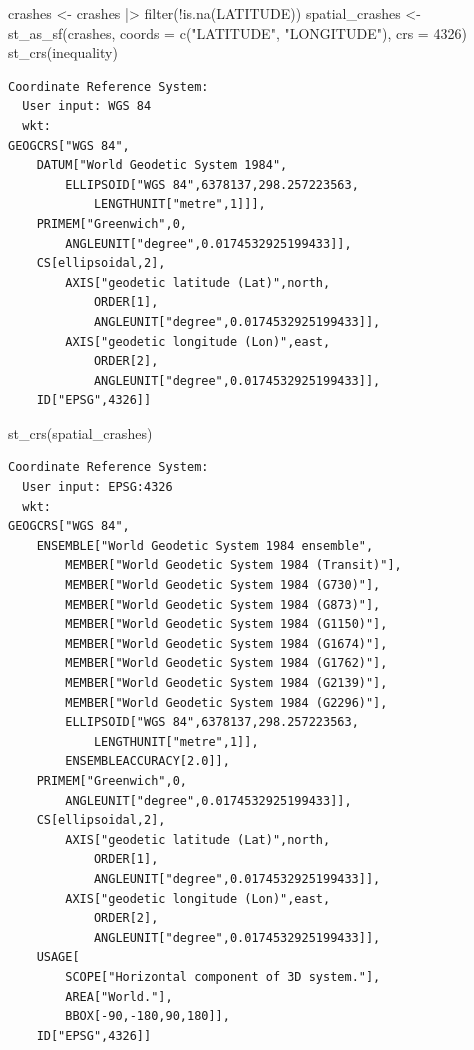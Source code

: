 \documentclass[
  letterpaper,
  DIV=11,
  numbers=noendperiod]{scrartcl}
\newenvironment{Shaded}{\begin{snugshade}}{\end{snugshade}}
\newcommand{\AttributeTok}[1]{\textcolor[rgb]{0.40,0.45,0.13}{#1}}
\newcommand{\DecValTok}[1]{\textcolor[rgb]{0.68,0.00,0.00}{#1}}
\newcommand{\FunctionTok}[1]{\textcolor[rgb]{0.28,0.35,0.67}{#1}}
\newcommand{\NormalTok}[1]{\textcolor[rgb]{0.00,0.23,0.31}{#1}}
\newcommand{\OtherTok}[1]{\textcolor[rgb]{0.00,0.23,0.31}{#1}}
\newcommand{\SpecialCharTok}[1]{\textcolor[rgb]{0.37,0.37,0.37}{#1}}
\newcommand{\StringTok}[1]{\textcolor[rgb]{0.13,0.47,0.30}{#1}}
\begin{document}
\begin{Shaded}
\begin{Highlighting}[]
\NormalTok{crashes }\OtherTok{\textless{}{-}}\NormalTok{ crashes }\SpecialCharTok{|\textgreater{}} \FunctionTok{filter}\NormalTok{(}\SpecialCharTok{!}\FunctionTok{is.na}\NormalTok{(LATITUDE))}
\NormalTok{spatial\_crashes }\OtherTok{\textless{}{-}} \FunctionTok{st\_as\_sf}\NormalTok{(crashes, }\AttributeTok{coords =} \FunctionTok{c}\NormalTok{(}\StringTok{"LATITUDE"}\NormalTok{, }\StringTok{"LONGITUDE"}\NormalTok{), }\AttributeTok{crs =} \DecValTok{4326}\NormalTok{)}
\FunctionTok{st\_crs}\NormalTok{(inequality)}
\end{Highlighting}
\end{Shaded}

\begin{verbatim}
Coordinate Reference System:
  User input: WGS 84 
  wkt:
GEOGCRS["WGS 84",
    DATUM["World Geodetic System 1984",
        ELLIPSOID["WGS 84",6378137,298.257223563,
            LENGTHUNIT["metre",1]]],
    PRIMEM["Greenwich",0,
        ANGLEUNIT["degree",0.0174532925199433]],
    CS[ellipsoidal,2],
        AXIS["geodetic latitude (Lat)",north,
            ORDER[1],
            ANGLEUNIT["degree",0.0174532925199433]],
        AXIS["geodetic longitude (Lon)",east,
            ORDER[2],
            ANGLEUNIT["degree",0.0174532925199433]],
    ID["EPSG",4326]]
\end{verbatim}

\begin{Shaded}
\begin{Highlighting}[]
\FunctionTok{st\_crs}\NormalTok{(spatial\_crashes)}
\end{Highlighting}
\end{Shaded}

\begin{verbatim}
Coordinate Reference System:
  User input: EPSG:4326 
  wkt:
GEOGCRS["WGS 84",
    ENSEMBLE["World Geodetic System 1984 ensemble",
        MEMBER["World Geodetic System 1984 (Transit)"],
        MEMBER["World Geodetic System 1984 (G730)"],
        MEMBER["World Geodetic System 1984 (G873)"],
        MEMBER["World Geodetic System 1984 (G1150)"],
        MEMBER["World Geodetic System 1984 (G1674)"],
        MEMBER["World Geodetic System 1984 (G1762)"],
        MEMBER["World Geodetic System 1984 (G2139)"],
        MEMBER["World Geodetic System 1984 (G2296)"],
        ELLIPSOID["WGS 84",6378137,298.257223563,
            LENGTHUNIT["metre",1]],
        ENSEMBLEACCURACY[2.0]],
    PRIMEM["Greenwich",0,
        ANGLEUNIT["degree",0.0174532925199433]],
    CS[ellipsoidal,2],
        AXIS["geodetic latitude (Lat)",north,
            ORDER[1],
            ANGLEUNIT["degree",0.0174532925199433]],
        AXIS["geodetic longitude (Lon)",east,
            ORDER[2],
            ANGLEUNIT["degree",0.0174532925199433]],
    USAGE[
        SCOPE["Horizontal component of 3D system."],
        AREA["World."],
        BBOX[-90,-180,90,180]],
    ID["EPSG",4326]]
\end{verbatim}
\end{document}
